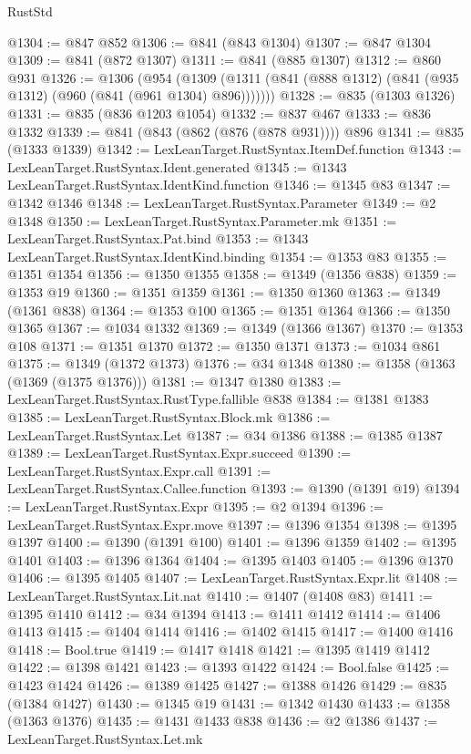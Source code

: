 \begin{lexlean}{RustStd}
\begin{coremodule}
@1304 := @847 @852
@1306 := @841 (@843 @1304)
@1307 := @847 @1304
@1309 := @841 (@872 @1307)
@1311 := @841 (@885 @1307)
@1312 := @860 @931
@1326 := @1306
    (@954 (@1309 (@1311 (@841 (@888 @1312) (@841 (@935 @1312) (@960 (@841 (@961 @1304) @896)))))))
@1328 := @835 (@1303 @1326)
@1331 := @835 (@836 @1203 @1054)
@1332 := @837 @467
@1333 := @836 @1332
@1339 := @841 (@843 (@862 (@876 (@878 @931)))) @896
@1341 := @835 (@1333 @1339)
@1342 := LexLeanTarget.RustSyntax.ItemDef.function
@1343 := LexLeanTarget.RustSyntax.Ident.generated
@1345 := @1343 LexLeanTarget.RustSyntax.IdentKind.function
@1346 := @1345 @83
@1347 := @1342 @1346
@1348 := LexLeanTarget.RustSyntax.Parameter
@1349 := @2 @1348
@1350 := LexLeanTarget.RustSyntax.Parameter.mk
@1351 := LexLeanTarget.RustSyntax.Pat.bind
@1353 := @1343 LexLeanTarget.RustSyntax.IdentKind.binding
@1354 := @1353 @83
@1355 := @1351 @1354
@1356 := @1350 @1355
@1358 := @1349 (@1356 @838)
@1359 := @1353 @19
@1360 := @1351 @1359
@1361 := @1350 @1360
@1363 := @1349 (@1361 @838)
@1364 := @1353 @100
@1365 := @1351 @1364
@1366 := @1350 @1365
@1367 := @1034 @1332
@1369 := @1349 (@1366 @1367)
@1370 := @1353 @108
@1371 := @1351 @1370
@1372 := @1350 @1371
@1373 := @1034 @861
@1375 := @1349 (@1372 @1373)
@1376 := @34 @1348
@1380 := @1358 (@1363 (@1369 (@1375 @1376)))
@1381 := @1347 @1380
@1383 := LexLeanTarget.RustSyntax.RustType.fallible @838
@1384 := @1381 @1383
@1385 := LexLeanTarget.RustSyntax.Block.mk
@1386 := LexLeanTarget.RustSyntax.Let
@1387 := @34 @1386
@1388 := @1385 @1387
@1389 := LexLeanTarget.RustSyntax.Expr.succeed
@1390 := LexLeanTarget.RustSyntax.Expr.call
@1391 := LexLeanTarget.RustSyntax.Callee.function
@1393 := @1390 (@1391 @19)
@1394 := LexLeanTarget.RustSyntax.Expr
@1395 := @2 @1394
@1396 := LexLeanTarget.RustSyntax.Expr.move
@1397 := @1396 @1354
@1398 := @1395 @1397
@1400 := @1390 (@1391 @100)
@1401 := @1396 @1359
@1402 := @1395 @1401
@1403 := @1396 @1364
@1404 := @1395 @1403
@1405 := @1396 @1370
@1406 := @1395 @1405
@1407 := LexLeanTarget.RustSyntax.Expr.lit
@1408 := LexLeanTarget.RustSyntax.Lit.nat
@1410 := @1407 (@1408 @83)
@1411 := @1395 @1410
@1412 := @34 @1394
@1413 := @1411 @1412
@1414 := @1406 @1413
@1415 := @1404 @1414
@1416 := @1402 @1415
@1417 := @1400 @1416
@1418 := Bool.true
@1419 := @1417 @1418
@1421 := @1395 @1419 @1412
@1422 := @1398 @1421
@1423 := @1393 @1422
@1424 := Bool.false
@1425 := @1423 @1424
@1426 := @1389 @1425
@1427 := @1388 @1426
@1429 := @835 (@1384 @1427)
@1430 := @1345 @19
@1431 := @1342 @1430
@1433 := @1358 (@1363 @1376)
@1435 := @1431 @1433 @838
@1436 := @2 @1386
@1437 := LexLeanTarget.RustSyntax.Let.mk

\end{coremodule}
\end{lexlean}
